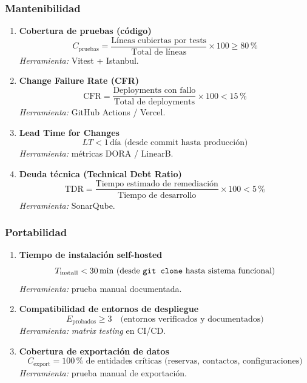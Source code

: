\documentclass[12pt, a4paper]{article}
\begin{document}
\subsubsection*{Mantenibilidad}

\begin{enumerate}[leftmargin=*, label=\textbf{KPI \arabic*.}, start=21]

    \item \textbf{Cobertura de pruebas (código)}
    \[
        C_{\text{pruebas}} = \frac{\text{Líneas cubiertas por tests}}{\text{Total de líneas}} \times 100 \geq 80\,\%
    \]
    \textit{Herramienta:} Vitest + Istanbul.

    \item \textbf{Change Failure Rate (CFR)}
    \[
        \text{CFR} = \frac{\text{Deployments con fallo}}{\text{Total de deployments}} \times 100 < 15\,\%
    \]
    \textit{Herramienta:} GitHub Actions / Vercel.

    \item \textbf{Lead Time for Changes}
    \[
        LT < 1\,\text{día (desde commit hasta producción)}
    \]
    \textit{Herramienta:} métricas DORA / LinearB.

    \item \textbf{Deuda técnica (Technical Debt Ratio)}
    \[
        \text{TDR} = \frac{\text{Tiempo estimado de remediación}}{\text{Tiempo de desarrollo}} \times 100 < 5\,\%
    \]
    \textit{Herramienta:} SonarQube.

\end{enumerate}

\subsubsection*{Portabilidad}

\begin{enumerate}[leftmargin=*, label=\textbf{KPI \arabic*.}, start=25]

    \item \textbf{Tiempo de instalación self-hosted}
    \[
        T_{\text{install}} < 30\,\text{min (desde \texttt{git clone} hasta sistema funcional)}
    \]
    \textit{Herramienta:} prueba manual documentada.

    \item \textbf{Compatibilidad de entornos de despliegue}
    \[
        E_{\text{probados}} \geq 3 \quad \text{(entornos verificados y documentados)}
    \]
    \textit{Herramienta:} \textit{matrix testing} en CI/CD.

    \item \textbf{Cobertura de exportación de datos}
    \[
        C_{\text{export}} = 100\,\% \text{ de entidades críticas (reservas, contactos, configuraciones)}
    \]
    \textit{Herramienta:} prueba manual de exportación.

\end{enumerate}
\end{document}
